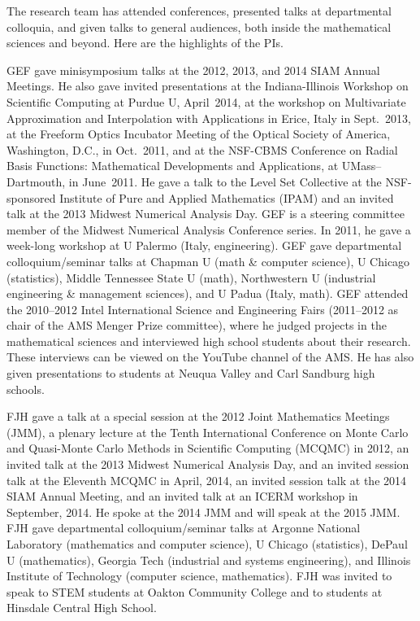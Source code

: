 \documentclass[11pt]{NSFamsart}
\begin{document}
The research team has attended conferences, presented talks at departmental colloquia, and given talks to general audiences, both inside the mathematical sciences and beyond. Here are the highlights of the PIs.

GEF gave minisymposium talks at the 2012, 2013, and 2014 SIAM Annual Meetings.  He also gave invited presentations at the Indiana-Illinois Workshop on Scientific Computing at Purdue U, April~2014, at the workshop on Multivariate Approximation and Interpolation with Applications in Erice, Italy in Sept.~2013, at the Freeform Optics Incubator Meeting of the Optical Society of America, Washington, D.C., in Oct.~2011, and at the NSF-CBMS Conference on Radial Basis Functions: Mathematical Developments and Applications, at UMass--Dartmouth, in June~2011. He gave a talk to the Level Set Collective at the NSF-sponsored Institute of Pure and Applied Mathematics (IPAM) and an invited talk at the 2013 Midwest Numerical Analysis Day. GEF is a steering committee member of the Midwest Numerical Analysis Conference series. In 2011, he gave a week-long workshop at U Palermo (Italy, engineering). GEF gave departmental colloquium/seminar talks at Chapman U (math \& computer science), U Chicago (statistics), Middle Tennessee State U (math), Northwestern U (industrial engineering \& management sciences), and U Padua (Italy, math).  GEF attended the 2010--2012 Intel International Science and Engineering Fairs (2011--2012 as chair of the AMS Menger Prize committee), where he judged projects in the mathematical sciences and interviewed high school students about their research. These interviews can be viewed on the YouTube channel of the AMS. He has also given presentations to students at Neuqua Valley and Carl Sandburg high schools.

FJH gave a talk at a special session at the 2012 Joint Mathematics Meetings (JMM), a plenary lecture at the Tenth International Conference on Monte Carlo and Quasi-Monte Carlo Methods in Scientific Computing (MCQMC) in 2012, an invited talk at the 2013 Midwest Numerical Analysis Day, and an invited session talk at the Eleventh MCQMC in April, 2014, an invited session talk at the 2014 SIAM Annual Meeting, and an invited talk at an ICERM workshop in September, 2014.  He spoke at the 2014 JMM and will speak at the 2015 JMM. FJH gave departmental colloquium/seminar talks at Argonne National Laboratory (mathematics and computer science), U Chicago (statistics), DePaul U (mathematics), Georgia Tech (industrial and systems engineering), and Illinois Institute of Technology (computer science, mathematics).  FJH was invited to speak to STEM students at Oakton Community College and to students at Hinsdale Central High School.
\end{document}
